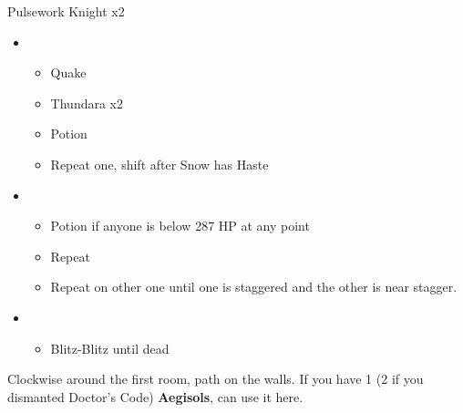 	\begin{battle}[0:36]{Pulsework Knight x2}
		\begin{itemize}
			\item \first
			      \begin{itemize}
				      \item Quake
				      \item Thundara x2
				      \item Potion
				      \item Repeat one, shift after Snow has Haste
			      \end{itemize}
			\item \second
			      \begin{itemize}
				      \item Potion if anyone is below 287 HP at any point
				      \item Repeat
				      \item Repeat on other one until one is staggered and the other is near stagger.
			      \end{itemize}
			\item \sixth
			      \begin{itemize}
				      \item Blitz-Blitz until dead
			      \end{itemize}
		\end{itemize}
	\end{battle}
	Clockwise around the first room, path on the walls.
	If you have 1 (2 if you dismanted Doctor's Code) \textbf{Aegisols}, can use it here.
	\renewcommand{\first}{[1] Riot Shield (\rav/\sen/\syn)}
	\renewcommand{\second}{[2] Tri-Disaster (\rav/\rav/\rav)}
	\renewcommand{\third}{[3] Mystic Tower (\rav/\sen/\rav)}
	\renewcommand{\fourth}{[4] Mystic Tower (\rav/\sen/\rav)}
	\renewcommand{\fifth}{[5] Malevolence (\rav/\rav/\syn)}
	\renewcommand{\sixth}{[6] Aggression (\com/\com/\rav)}
